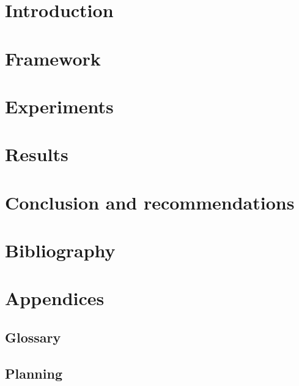 \documentclass{report}
\begin{document}
\chapter{Introduction}



\chapter{Framework}



\chapter{Experiments}



\chapter{Results}



\chapter{Conclusion and recommendations}



\chapter{Bibliography}



\appendix
{}
\chapter*{Appendices}
\renewcommand{\thesection}{\Alph{section}}
\section{Glossary}

\section{Planning}

\end{document}
